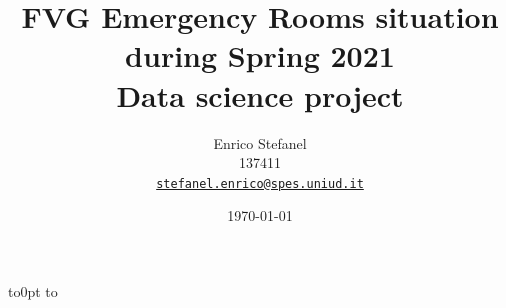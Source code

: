\documentclass[8pt,english,aspectratio=169]{beamer}
\title[FVG Emergency Rooms situation]{FVG Emergency Rooms situation during Spring 2021\\\smallskip \small Data science project}
\author[\href{mailto:stefanel.enrico@spes.uniud.it}{Enrico Stefanel}]{Enrico Stefanel\\137411\\\href{mailto:stefanel.enrico@spes.uniud.it}{\texttt{stefanel.enrico@spes.uniud.it}}}
\date{\today}
\begin{document}
\begin{frame}[plain]
\begin{center}
    \vbox to0pt{%
    \vbox to\vss}
  \end{center}
  \titlepage
\end{frame}
\end{document}
